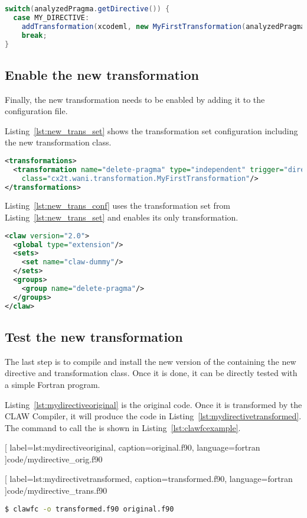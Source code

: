 \begin{lstlisting}[label=lst:categorization, caption=ClawTranslator.java,
  language=java]
switch(analyzedPragma.getDirective()) {
  case MY_DIRECTIVE:
    addTransformation(xcodeml, new MyFirstTransformation(analyzedPragma));
    break;
}
\end{lstlisting}


\subsection{Enable the new transformation}
Finally, the new transformation needs to be enabled by adding it to the
configuration file.

Listing~\ref{lst:new_trans_set} shows the transformation set configuration
including the new transformation class.


\begin{lstlisting}[label=lst:new_trans_set, caption=claw-dummy-set.xml, language=xml]
<transformations>
  <transformation name="delete-pragma" type="independent" trigger="directive"
    class="cx2t.wani.transformation.MyFirstTransformation"/>
</transformations>
\end{lstlisting}

Listing~\ref{lst:new_trans_conf} uses the transformation set from
Listing~\ref{lst:new_trans_set} and enables its only transformation.

\begin{lstlisting}[label=lst:new_trans_conf, caption=claw-dummy.xml, language=xml]
<claw version="2.0">
  <global type="extension"/>
  <sets>
    <set name="claw-dummy"/>
  </sets>
  <groups>
    <group name="delete-pragma"/>
  </groups>
</claw>
\end{lstlisting}

\subsection{Test the new transformation}
The last step is to compile and install the new version of the \clawfcomp
containing the new directive and transformation class. Once it is done, it
can be directly tested with a simple Fortran program.

Listing~\ref{lst:mydirectiveoriginal} is the original code. Once it is
transformed by the CLAW Compiler, it will produce the code
in Listing~\ref{lst:mydirectivetransformed}. The command to call
the \clawfcomp is shown in Listing~\ref{lst:clawfcexample}.


  [
    label=lst:mydirectiveoriginal,
    caption=original.f90,
    language=fortran
  ]{code/mydirective_orig.f90}


  [
    label=lst:mydirectivetransformed,
    caption=transformed.f90,
    language=fortran
  ]{code/mydirective_trans.f90}

\begin{lstlisting}[label=lst:clawfcexample, caption=Call the compiler, language=bash]
$ clawfc -o transformed.f90 original.f90
\end{lstlisting}

